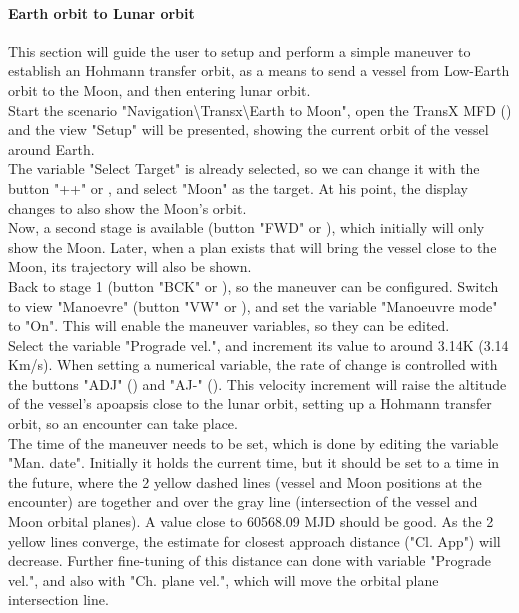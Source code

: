 \documentclass[Orbiter User Manual.tex]{subfiles}
\begin{document}
\paragraph{Earth orbit to Lunar orbit}
This section will guide the user to setup and perform a simple maneuver to establish an Hohmann transfer orbit, as a means to send a vessel from Low-Earth orbit to the Moon, and then entering lunar orbit.\\
Start the scenario "Navigation\textbackslash Transx\textbackslash Earth to Moon", open the TransX MFD (\Shift{}) and the view "Setup" will be presented, showing the current orbit of the vessel around Earth.\\
The variable "Select Target" is already selected, so we can change it with the button "++" or \Shift\keystroke{=}, and select "Moon" as the target. At his point, the display changes to also show the Moon's orbit.\\
Now, a second stage is available (button "FWD" or \Shift{}), which initially will only show the Moon. Later, when a plan exists that will bring the vessel close to the Moon, its trajectory will also be shown.\\
Back to stage 1 (button "BCK" or \Shift{}), so the maneuver can be configured. Switch to view "Manoevre" (button "VW" or \Shift{}), and set the variable "Manoeuvre mode" to "On". This will enable the maneuver variables, so they can be edited.\\
Select the variable "Prograde vel.", and increment its value to around 3.14K (3.14 Km/s). When setting a numerical variable, the rate of change is controlled with the buttons "ADJ" (\Shift\keystroke{\{}) and "AJ-" (\Shift\keystroke{\}}). This velocity increment will raise the altitude of the vessel's apoapsis close to the lunar orbit, setting up a Hohmann transfer orbit, so an encounter can take place.\\
The time of the maneuver needs to be set, which is done by editing the variable "Man. date". Initially it holds the current time, but it should be set to a time in the future, where the 2 yellow dashed lines (vessel and Moon positions at the encounter) are together and over the gray line (intersection of the vessel and Moon orbital planes). A value close to 60568.09 MJD should be good. As the 2 yellow lines converge, the estimate for closest approach distance ("Cl. App") will decrease. Further fine-tuning of this distance can done with variable "Prograde vel.", and also with "Ch. plane vel.", which will move the orbital plane intersection line.\\
\end{document}
